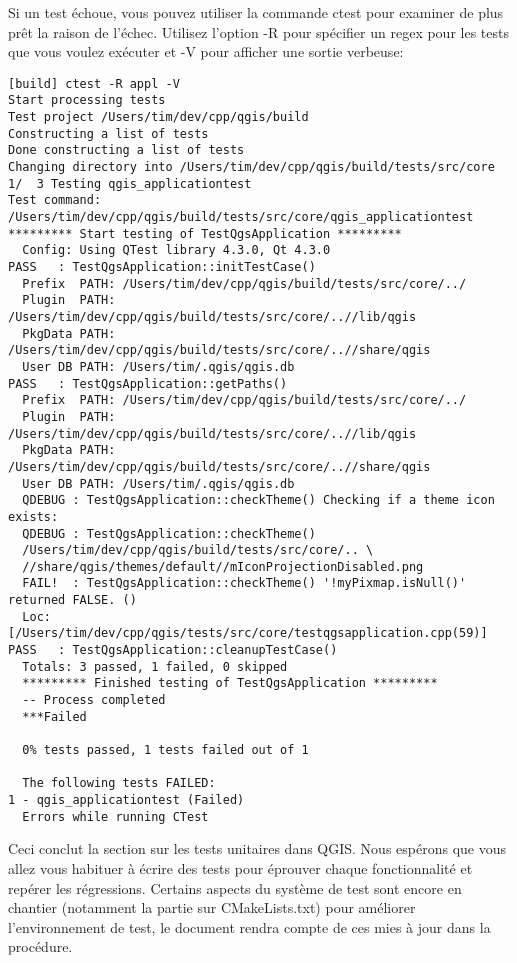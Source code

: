 Si un test \'echoue, vous pouvez utiliser la commande ctest pour examiner de plus pr\^et la raison de l'\'echec. Utilisez l'option -R pour sp\'ecifier un regex pour les tests que vous voulez ex\'ecuter et -V pour afficher une sortie verbeuse:

\begin{verbatim}
[build] ctest -R appl -V
Start processing tests
Test project /Users/tim/dev/cpp/qgis/build
Constructing a list of tests
Done constructing a list of tests
Changing directory into /Users/tim/dev/cpp/qgis/build/tests/src/core
1/  3 Testing qgis_applicationtest          
Test command: /Users/tim/dev/cpp/qgis/build/tests/src/core/qgis_applicationtest
********* Start testing of TestQgsApplication *********
  Config: Using QTest library 4.3.0, Qt 4.3.0
PASS   : TestQgsApplication::initTestCase()
  Prefix  PATH: /Users/tim/dev/cpp/qgis/build/tests/src/core/../
  Plugin  PATH: /Users/tim/dev/cpp/qgis/build/tests/src/core/..//lib/qgis
  PkgData PATH: /Users/tim/dev/cpp/qgis/build/tests/src/core/..//share/qgis
  User DB PATH: /Users/tim/.qgis/qgis.db
PASS   : TestQgsApplication::getPaths()
  Prefix  PATH: /Users/tim/dev/cpp/qgis/build/tests/src/core/../
  Plugin  PATH: /Users/tim/dev/cpp/qgis/build/tests/src/core/..//lib/qgis
  PkgData PATH: /Users/tim/dev/cpp/qgis/build/tests/src/core/..//share/qgis
  User DB PATH: /Users/tim/.qgis/qgis.db
  QDEBUG : TestQgsApplication::checkTheme() Checking if a theme icon exists:
  QDEBUG : TestQgsApplication::checkTheme() 
  /Users/tim/dev/cpp/qgis/build/tests/src/core/.. \
  //share/qgis/themes/default//mIconProjectionDisabled.png
  FAIL!  : TestQgsApplication::checkTheme() '!myPixmap.isNull()' returned FALSE. ()
  Loc: [/Users/tim/dev/cpp/qgis/tests/src/core/testqgsapplication.cpp(59)]
PASS   : TestQgsApplication::cleanupTestCase()
  Totals: 3 passed, 1 failed, 0 skipped
  ********* Finished testing of TestQgsApplication *********
  -- Process completed
  ***Failed

  0% tests passed, 1 tests failed out of 1

  The following tests FAILED:
1 - qgis_applicationtest (Failed)
  Errors while running CTest

\end{verbatim}

Ceci conclut la section sur les tests unitaires dans QGIS. Nous esp\'erons que vous allez vous habituer \`a \'ecrire des tests pour \'eprouver chaque fonctionnalit\'e et rep\'erer les r\'egressions. Certains aspects du syst\`eme de test sont encore en chantier (notamment la partie sur CMakeLists.txt) pour am\'eliorer l'environnement de test, le document rendra compte de ces mies \`a jour dans la proc\'edure.

